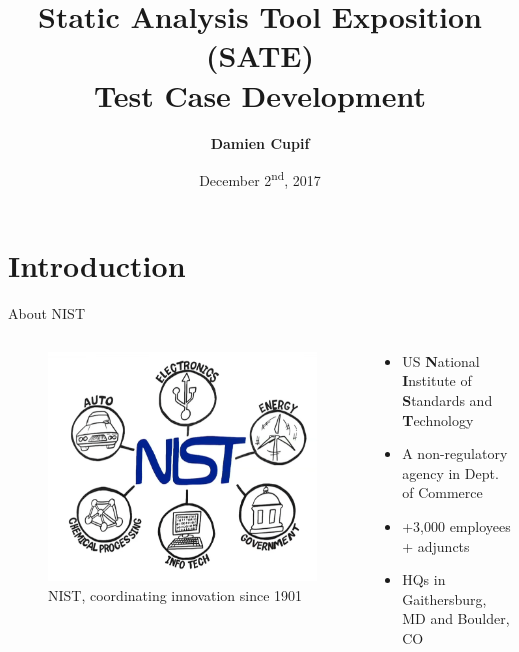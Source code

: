 \documentclass[aspectratio=169]{beamer}
\title{Static Analysis Tool Exposition (SATE)\\Test Case Development}
\date{December 2\textsuperscript{nd}, 2017}
\author{\textbf{Damien Cupif}}
\institute{\textbf{\textit{Oral Defense for TELECOM Nancy Master's Degree}}}
\begin{document}
  \maketitle

  \section*{Introduction}
  
  \begin{frame}{About NIST}
    \begin{columns}[t]
      \begin{column}{0.29\textwidth}
        \begin{figure}
          \centering
          \includegraphics[scale=0.14]{figures/nist-central-role}
          \caption{NIST, coordinating innovation since 1901}
        \end{figure}
      \end{column}
      \begin{column}{0.71\textwidth}
        \begin{small}
        \begin{itemize}
        \item US \textbf{N}ational \textbf{I}nstitute of \textbf{S}tandards and \textbf{T}echnology
        \item A non-regulatory agency in Dept. of Commerce
        \item \alert{+3,000} employees + adjuncts
        \item HQs in Gaithersburg, MD and Boulder, CO

\end{itemize}
\end{small}
\end{column}
\end{columns}
\end{frame}
\end{document}
